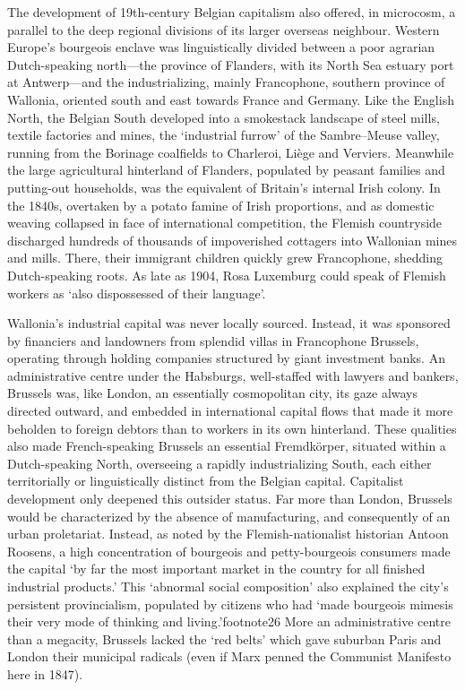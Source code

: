 \documentclass[
]{book}
\begin{document}
The development of 19th-century Belgian capitalism also offered, in microcosm, a parallel to the deep regional divisions of its larger overseas neighbour. Western Europe's bourgeois enclave was linguistically divided between a poor agrarian Dutch-speaking north---the province of Flanders, with its North Sea estuary port at Antwerp---and the industrializing, mainly Francophone, southern province of Wallonia, oriented south and east towards France and Germany. Like the English North, the Belgian South developed into a smokestack landscape of steel mills, textile factories and mines, the `industrial furrow' of the Sambre--Meuse valley, running from the Borinage coalfields to Charleroi, Liège and Verviers. Meanwhile the large agricultural hinterland of Flanders, populated by peasant families and putting-out households, was the equivalent of Britain's internal Irish colony. In the 1840s, overtaken by a potato famine of Irish proportions, and as domestic weaving collapsed in face of international competition, the Flemish countryside discharged hundreds of thousands of impoverished cottagers into Wallonian mines and mills. There, their immigrant children quickly grew Francophone, shedding Dutch-speaking roots. As late as 1904, Rosa Luxemburg could speak of Flemish workers as `also dispossessed of their language'.

Wallonia's industrial capital was never locally sourced. Instead, it was sponsored by financiers and landowners from splendid villas in Francophone Brussels, operating through holding companies structured by giant investment banks. An administrative centre under the Habsburgs, well-staffed with lawyers and bankers, Brussels was, like London, an essentially cosmopolitan city, its gaze always directed outward, and embedded in international capital flows that made it more beholden to foreign debtors than to workers in its own hinterland. These qualities also made French-speaking Brussels an essential Fremdkörper, situated within a Dutch-speaking North, overseeing a rapidly industrializing South, each either territorially or linguistically distinct from the Belgian capital. Capitalist development only deepened this outsider status. Far more than London, Brussels would be characterized by the absence of manufacturing, and consequently of an urban proletariat. Instead, as noted by the Flemish-nationalist historian Antoon Roosens, a high concentration of bourgeois and petty-bourgeois consumers made the capital `by far the most important market in the country for all finished industrial products.' This `abnormal social composition' also explained the city's persistent provincialism, populated by citizens who had `made bourgeois mimesis their very mode of thinking and living.'footnote26 More an administrative centre than a megacity, Brussels lacked the `red belts' which gave suburban Paris and London their municipal radicals (even if Marx penned the Communist Manifesto here in 1847).
\end{document}
